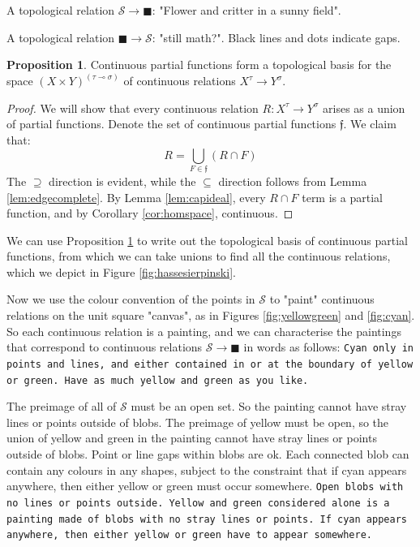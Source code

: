 \documentclass{tufte-handout}
\theoremstyle{definition}
\newtheorem{proposition}[theorem]{Proposition}
\begin{document}
\begin{marginfigure}
\centering
{}
\caption{A topological relation $\mathcal{S} \rightarrow \blacksquare$: "Flower and critter in a sunny field".}
\label{fig:flower}
\end{marginfigure}

\begin{marginfigure}
\centering
{}
\caption{A topological relation $\blacksquare \rightarrow \mathcal{S}$: "still math?". Black lines and dots indicate gaps.}
\label{fig:shitpost}
\end{marginfigure}

\begin{proposition}\label{prop:hombasis}
Continuous partial functions form a topological basis for the space $(X \times Y)^{(\tau \multimap \sigma)}$ of continuous relations $X^\tau \rightarrow Y^\sigma$.
\begin{proof}
We will show that every continuous relation $R: X^\tau \rightarrow Y^\sigma$ arises as a union of partial functions. Denote the set of continuous partial functions $\mathfrak{f}$. We claim that:
\[ R = \bigcup\limits_{F \in \mathfrak{f}} (R \cap F) \]
The $\supseteq$ direction is evident, while the $\subseteq$ direction follows from Lemma \ref{lem:edgecomplete}.
By Lemma \ref{lem:capideal}, every $R \cap F$ term is a partial function, and by Corollary \ref{cor:homspace}, continuous.
\end{proof}
\end{proposition}

 We can use Proposition \ref{prop:hombasis} to write out the topological basis of continuous partial functions, from which we can take unions to find all the continuous relations, which we depict in Figure \ref{fig:hassesierpinski}.

Now we use the colour convention of the points in $\mathcal{S}$ to "paint" continuous relations on the unit square "canvas", as in Figures \ref{fig:yellowgreen} and \ref{fig:cyan}. So each continuous relation is a painting, and we can characterise the paintings that correspond to continuous relations $\mathcal{S} \rightarrow \blacksquare$ in words as follows: \texttt{Cyan only in points and lines, and either contained in or at the boundary of yellow or green. Have as much yellow and green as you like.}

 The preimage of all of $\mathcal{S}$ must be an open set. So the painting cannot have stray lines or points outside of blobs. The preimage of yellow must be open, so the union of yellow and green in the painting cannot have stray lines or points outside of blobs. Point or line gaps within blobs are ok. Each connected blob can contain any colours in any shapes, subject to the constraint that if cyan appears anywhere, then either yellow or green must occur somewhere. \texttt{Open blobs with no lines or points outside. Yellow and green considered alone is a painting made of blobs with no stray lines or points. If cyan appears anywhere, then either yellow or green have to appear somewhere.}
\end{document}
